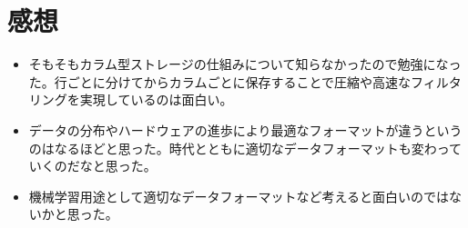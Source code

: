 \documentclass[uplatex]{jsarticle}
\theoremstyle{remark}
\begin{document}
\section{感想}
\begin{itemize}
  \item そもそもカラム型ストレージの仕組みについて知らなかったので勉強になった。行ごとに分けてからカラムごとに保存することで圧縮や高速なフィルタリングを実現しているのは面白い。
  \item データの分布やハードウェアの進歩により最適なフォーマットが違うというのはなるほどと思った。時代とともに適切なデータフォーマットも変わっていくのだなと思った。
  \item 機械学習用途として適切なデータフォーマットなど考えると面白いのではないかと思った。
\end{itemize}




\end{document}
